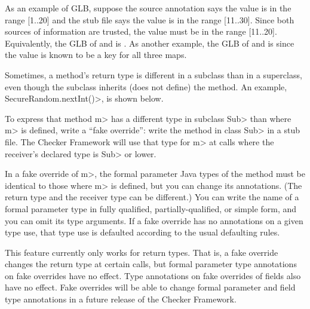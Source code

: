 As an example of GLB, suppose the source annotation says the value is in
the range [1..20] and the stub file says the value is in the range
[11..30].  Since both sources of information are trusted, the value must be
in the range [11..20].  Equivalently, the GLB of
 and
 is
.
As another example, the GLB of
 and
 is
since the value is known to be a key for all three maps.



Sometimes, a method's return type is different in a subclass than in a
superclass, even though the subclass inherits (does not define) the method.
An example, \<SecureRandom.nextInt()>, is shown below.

To express that method \<m> has a different type in subclass \<Sub> than
where \<m> is defined, write a ``fake override'':  write the method in
class \<Sub> in a stub file.  The Checker Framework will use that type for
\<m> at calls where the receiver's declared type is \<Sub> or lower.

In a fake override of \<m>, the formal parameter Java types of the method
must be identical to those where \<m> is defined, but you can change its
annotations.  (The return type and the receiver type can be different.)
You can write the name of a formal parameter type in fully qualified,
partially-qualified, or simple form, and you can omit its type arguments.
If a fake override has no annotations on a given type use, that type use is
defaulted according to the usual defaulting rules.

This feature currently only works for return types.  That is, a fake
override changes the return type at certain calls, but formal parameter
type annotations on fake overrides have no effect.  Type annotations on
fake overrides of fields also have no effect.  Fake overrides will be able
to change formal parameter and field type annotations in a future release
of the Checker Framework.



